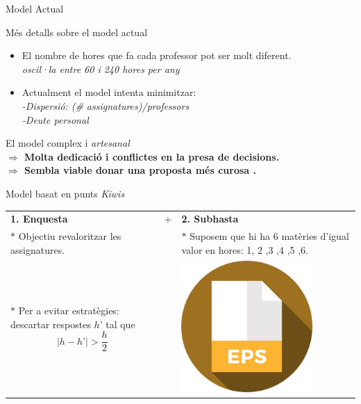 \documentclass[twocolumn]{beamer}
\begin{document}
\begin{frame}{Model Actual} %
\begin{box1}{\normalsize Més detalls sobre el model actual}
	\begin{itemize}
		\item El nombre de hores que fa cada professor pot ser molt diferent. \\ \textit{\footnotesize \color{blue} oscil·la entre 60 i 240 hores per any}
		\item Actualment el model intenta minimitzar:
		\textit{\footnotesize \color{blue}
			\\-Dispersió: (\# assignatures)/professors
			\\-Deute personal}
	\end{itemize}
\end{box1}
El model complex i \textit{artesanal} \\\textbf{ $\Rightarrow$ Molta dedicació i conflictes en la presa de decisions.}
\\\textbf{ $\Rightarrow$ Sembla viable donar una proposta més curosa .}
\end{frame}
\begin{frame}{Model basat en punts \textit{Kiwis}}
\begin{tabular}{ m{10em}  m{2em}  m{10em} }
	\textbf{1. Enquesta}&{\Large +}&\textbf{2. Subhasta}\\
	\color{redviolet} $*$ Objectiu revaloritzar les assignatures. 
	&& \color{redviolet} $*$ Suposem que hi ha 6 matèries d'igual valor en hores: 1, 2 ,3 ,4 ,5 ,6.\\
	\color{redviolet} $*$ Per a evitar estratègies: descartar respostes $h’$ tal que $$|h-h’|>\frac{h}{2}$$&&\includegraphics[width=5cm]{eps}
\end{tabular}
\end{frame}
\end{document}
